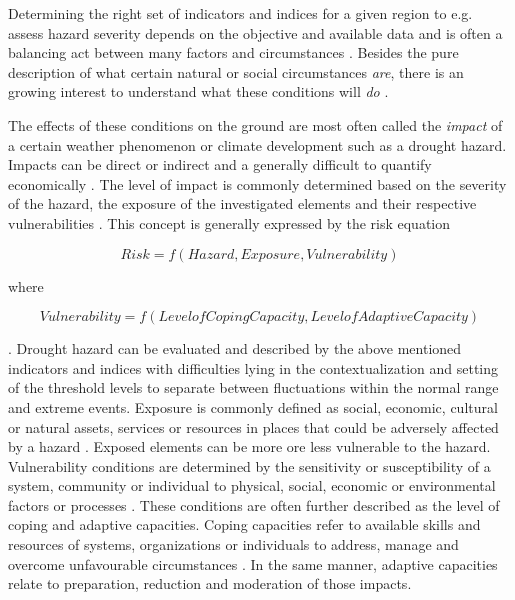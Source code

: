 Determining the right set of indicators and indices for a given region to e.g. assess hazard severity depends on the objective and available data and is often a balancing act between many factors and circumstances \autocite{svobodaHandbookDroughtIndicators2016}. Besides the pure description of what certain natural or social circumstances \textit{are}, there is an growing interest to understand what these conditions will \textit{do} \autocite{boultDroughtImpactbasedForecasting2022, lackstromBackyardHydroclimatologyCitizen2022}.

The effects of these conditions on the ground are most often called the \textit{impact} of a certain weather phenomenon or climate development such as a drought hazard. Impacts can be direct or indirect and a generally difficult to quantify economically \autocite{vereintenationenSpecialReportDrought2021}. The level of impact is commonly determined based on the severity of the hazard, the exposure of the investigated elements and their respective vulnerabilities \autocite{harrowsmithFutureForecastImpact2020,svobodaHandbookDroughtIndicators2016,vereintenationenSpecialReportDrought2021}.
This concept is generally expressed by the risk equation

        \[Risk = f(Hazard, Exposure, Vulnerability)\]

    where

        \[Vulnerability = f(Level of Coping Capacity, Level of Adaptive Capacity)\]

\autocite{boultDroughtImpactbasedForecasting2022,harrowsmithFutureForecastImpact2020,vereintenationenSpecialReportDrought2021}. Drought hazard can be evaluated and described by the above mentioned indicators and indices with difficulties lying in the contextualization and setting of the threshold levels to separate between fluctuations within the normal range and extreme events. Exposure is commonly defined as social, economic, cultural or natural assets, services or resources in places that could be adversely affected by a hazard \autocite{ipccClimateChange20142014}. Exposed elements can be more ore less vulnerable to the hazard. Vulnerability conditions are determined by the sensitivity or susceptibility of a system, community or individual to physical, social, economic or environmental factors or processes \autocite{ipccClimateChange20142014}. These conditions are often further described as the level of coping and adaptive capacities. Coping capacities refer to available skills and resources of systems, organizations or individuals to address, manage and overcome unfavourable circumstances \autocite{ipccGlossaryTerms2012}. In the same manner, adaptive capacities relate to preparation, reduction and moderation of those impacts.


